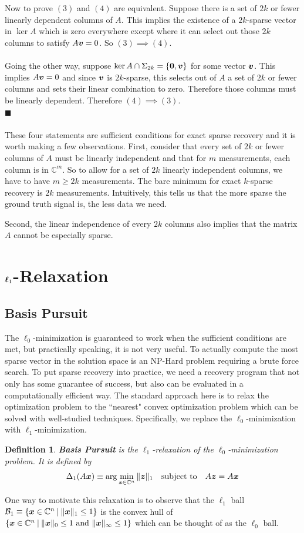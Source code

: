 \documentclass[twocolumn]{gwclass}
\newtheorem{definition}{Definition}
\renewcommand\qedsymbol{$\blacksquare$}
\newcommand{\C}{\mathbb{C}}
\begin{document}
	\\
	\\
	Now to prove $(3)$ and $(4)$ are equivalent. Suppose there is a set of $2k$ or fewer linearly dependent columns of $A$. This implies the existence of a $2k$-sparse vector in $\ker A$ which is zero everywhere except where it can select out those $2k$ columns to satisfy $A\boldsymbol{v}=0$. So $(3)\implies (4)$.
	\\
	\\
	Going the other way, suppose $\ker A\cap\Sigma_{2k}=\{\boldsymbol{0},\boldsymbol{v}\}$ for some vector $\boldsymbol{v}$. This implies $A\boldsymbol{v}=0$ and since $\boldsymbol{v}$ is $2k$-sparse, this selects out of $A$ a set of $2k$ or fewer columns and sets their linear combination to zero. Therefore those columns must be linearly dependent. Therefore $(4)\implies(3)$.
	\\
	\qedsymbol{}
	\\
	\\
	These four statements are sufficient conditions for exact sparse recovery and it is worth making a few observations. First, consider that every set of $2k$ or fewer columns of $A$ must be linearly independent and that for $m$ measurements, each column is in $\C^m$. So to allow for a set of $2k$ linearly independent columns, we have to have $m\geq 2k$ measurements. The bare minimum for exact $k$-sparse recovery is $2k$ measurements. Intuitively, this tells us that the more sparse the ground truth signal is, the less data we need. 
	
	Second, the linear independence of every $2k$ columns also implies that the matrix $A$ cannot be especially sparse. 
	
	\section{$\boldsymbol{\ell}_1$-Relaxation}
	\subsection{Basis Pursuit}
	The $\ell_0$-minimization is guaranteed to work when the sufficient conditions are met, but practically speaking, it is not very useful. To actually compute the most sparse vector in the solution space is an NP-Hard problem requiring a brute force search. To put sparse recovery into practice, we need a recovery program that not only has some guarantee of success, but also can be evaluated in a computationally efficient way. The standard approach here is to relax the optimization problem to the ``nearest" convex optimization problem which can be solved with well-studied techniques. Specifically, we replace the $\ell_0$-minimization with $\ell_1$-minimization.
	\begin{definition}
		\textbf{Basis Pursuit} is the $\ell_1$-relaxation of the $\ell_0$-minimization problem. It is defined by
		$$\Delta_1(A\*x) \equiv \arg\min_{\*z\in\C^n} \|\*z\|_1 \quad\t{subject to}\quad A\*z=A\*x$$
	\end{definition}
	One way to motivate this relaxation is to observe that the $\ell_1$ ball $\mathcal{B}_1 \equiv \{  \*x\in\C^n \:|\: \|\*x\|_1\leq 1\}$ is the convex hull of $\{\*x\in\C^n \:|\: \|\*x\|_0\leq 1 \t{ and }\|\*x\|_\infty\leq 1\}$ which can be thought of as the $\ell_0$ ball.	
	
\end{document}
